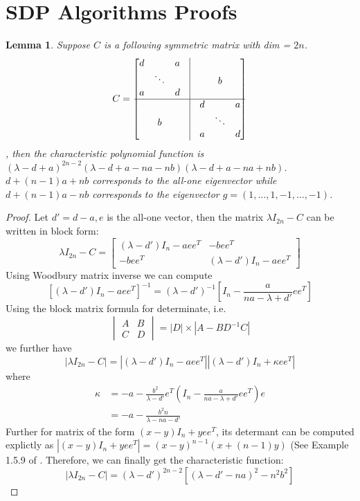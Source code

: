 \documentclass{ctexart}
\newtheorem{lemma}{Lemma}
\begin{document}
	\section{SDP Algorithms Proofs}
	\begin{lemma}\label{lem:Cabd}
	Suppose $C$ is a following symmetric matrix with dim = $2n$.
	$$C=\begin{bmatrix} d & \text{ } &  a & \vrule & \text{ } & \text{ }  & \text{ } \\
\text{ } & \ddots & \text{ } & \vrule & \text{ }&  b & \text{ } \\
a & \text{ } & d & \vrule & \text{ } & \text{ } & \text{ } \\ \hline
 \text{ } & \text{ }  & \text{ } & \vrule & d & \text{ } & a \\
 \text{ }& b & \text{ }  & \vrule & \text{ } & \ddots & \text{ } \\
\text{ } & \text{ } & \text{ }& \vrule & a & \text{ } & d \\
\end{bmatrix}$$,
then the characteristic polynomial function is $(\lambda - d + a)^{2n-2} (\lambda - d + a - na - nb)
 (\lambda - d + a - na + nb)$. $d + (n-1)a+ nb$ corresponds to the all-one eigenvector while 
 $d +(n-1)a -nb$ corresponds to the eigenvector $g=(1,\dots, 1, -1, \dots, -1)$.
\end{lemma}
\begin{proof}
Let $d' = d-a, e$ is the all-one vector, then the matrix $\lambda I_{2n} - C$ can be written in block form:
$$
\lambda I_{2n} - C = \begin{bmatrix}
(\lambda -d') I_n - a ee^T & -b ee^T \\
-bee^T & (\lambda -d') I_n - a ee^T
\end{bmatrix}
$$
Using Woodbury matrix inverse we can compute
$$
[(\lambda -d') I_n - a ee^T]^{-1} = (\lambda - d')^{-1} [I_n - \frac{a}{na - \lambda + d'} ee^T]
$$
Using the block matrix formula for determinate, i.e.
$$
\begin{vmatrix}
A & B \\
C & D
\end{vmatrix} = |D| \times |A-BD^{-1}C|
$$
we further have
$$
|\lambda I_{2n} - C| = |(\lambda -d') I_n - a ee^T| |(\lambda - d')I_n + \kappa ee^T|
$$
where
\begin{align*}
\kappa &= -a - \frac{b^2}{\lambda - d'} e^T (I_n - \frac{a}{na-\lambda + d'}ee^T)e \\
&= -a  - \frac{b^2 n}{\lambda - na - d'}
\end{align*}
Further for matrix of the form $(x-y)I_n + yee^T$, its determant can be computed explictly
as $|(x-y)I_n + yee^T|=(x-y)^{n-1}(x+(n-1)y)$ (See Example 1.5.9 of \cite{ad_li}.
Therefore, we can finally get the characteristic function:
$$
|\lambda I_{2n} - C| = (\lambda -d')^{2n-2} [(\lambda - d' - na)^2-n^2b^2]
$$
\end{proof}
\end{document}
